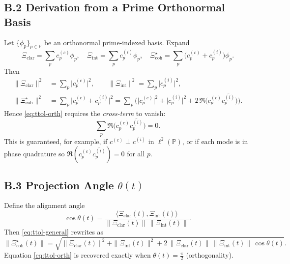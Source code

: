 \documentclass[12pt]{amsart}
\theoremstyle{plain}
\begin{document}
\subsection*{B.2 Derivation from a Prime Orthonormal Basis}
Let $\{\phi_{p}\}_{p\in\mathbb{P}}$ be an orthonormal prime-indexed basis. Expand
\[
\Xi_{\mathrm{clar}}=\sum_{p} c^{(c)}_{p}\phi_{p},\quad
\Xi_{\mathrm{int}}=\sum_{p} c^{(i)}_{p}\phi_{p},\quad
\Xi_{\mathrm{coh}}^{\star}=\sum_{p}\big(c^{(c)}_{p}+c^{(i)}_{p}\big)\phi_{p}.
\]
Then
\begin{align*}
\|\Xi_{\mathrm{clar}}\|^{2}&=\sum_{p}\big|c^{(c)}_{p}\big|^{2},\qquad
\|\Xi_{\mathrm{int}}\|^{2}=\sum_{p}\big|c^{(i)}_{p}\big|^{2},\\
\|\Xi_{\mathrm{coh}}^{\star}\|^{2}
&=\sum_{p}\big|c^{(c)}_{p}+c^{(i)}_{p}\big|^{2}
=\sum_{p}\Big(\big|c^{(c)}_{p}\big|^{2}+\big|c^{(i)}_{p}\big|^{2}
+2\,\Re\big(c^{(c)}_{p}\overline{c^{(i)}_{p}}\big)\Big).
\end{align*}
Hence \eqref{eq:ttol-orth} requires the \emph{cross-term} to vanish:
\[
\sum_{p}\Re\big(c^{(c)}_{p}\overline{c^{(i)}_{p}}\big)=0.
\]
This is guaranteed, for example, if $c^{(c)}\perp c^{(i)}$ in $\ell^{2}(\mathbb{P})$, or if each mode is in phase quadrature so $\Re(c^{(c)}_{p}\overline{c^{(i)}_{p}})=0$ for all $p$.

\subsection*{B.3 Projection Angle $\theta(t)$}
Define the alignment angle
\[
\cos\theta(t)=\frac{\langle \Xi_{\mathrm{clar}}(t),\Xi_{\mathrm{int}}(t)\rangle}
{\|\Xi_{\mathrm{clar}}(t)\|\,\|\Xi_{\mathrm{int}}(t)\|}.
\]
Then \eqref{eq:ttol-general} rewrites as
\[
\|\Xi_{\mathrm{coh}}^{\star}(t)\|
=\sqrt{\|\Xi_{\mathrm{clar}}(t)\|^{2}+\|\Xi_{\mathrm{int}}(t)\|^{2}
+2\,\|\Xi_{\mathrm{clar}}(t)\|\,\|\Xi_{\mathrm{int}}(t)\|\,\cos\theta(t)}.
\]
Equation \eqref{eq:ttol-orth} is recovered exactly when $\theta(t)=\tfrac{\pi}{2}$ (orthogonality).
\end{document}
